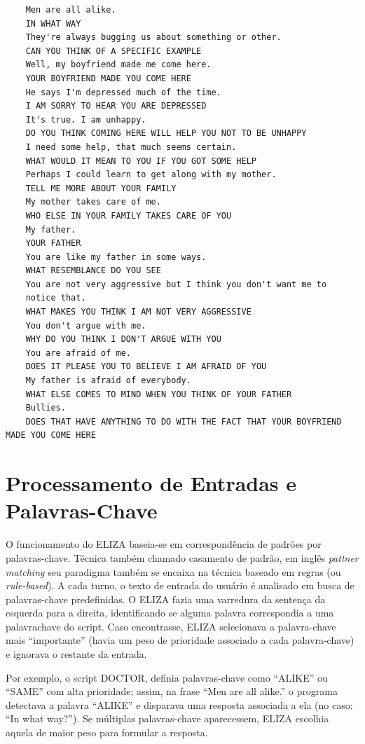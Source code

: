 \documentclass[14pt,a4paper,oneside]{book}
\begin{document}
\begin{verbatim}
	Men are all alike. 
	IN WHAT WAY 
	They're always bugging us about something or other. 
	CAN YOU THINK OF A SPECIFIC EXAMPLE 
	Well, my boyfriend made me come here. 
	YOUR BOYFRIEND MADE YOU COME HERE 
	He says I'm depressed much of the time. 
	I AM SORRY TO HEAR YOU ARE DEPRESSED 
	It's true. I am unhappy. 
	DO YOU THINK COMING HERE WILL HELP YOU NOT TO BE UNHAPPY 
	I need some help, that much seems certain. 
	WHAT WOULD IT MEAN TO YOU IF YOU GOT SOME HELP 
	Perhaps I could learn to get along with my mother. 
	TELL ME MORE ABOUT YOUR FAMILY 
	My mother takes care of me. 
	WHO ELSE IN YOUR FAMILY TAKES CARE OF YOU 
	My father. 
	YOUR FATHER 
	You are like my father in some ways. 
	WHAT RESEMBLANCE DO YOU SEE 
	You are not very aggressive but I think you don't want me to 
	notice that. 
	WHAT MAKES YOU THINK I AM NOT VERY AGGRESSIVE 
	You don't argue with me. 
	WHY DO YOU THINK I DON'T ARGUE WITH YOU 
	You are afraid of me. 
	DOES IT PLEASE YOU TO BELIEVE I AM AFRAID OF YOU 
	My father is afraid of everybody. 
	WHAT ELSE COMES TO MIND WHEN YOU THINK OF YOUR FATHER 
	Bullies. 
	DOES THAT HAVE ANYTHING TO DO WITH THE FACT THAT YOUR BOYFRIEND MADE YOU COME HERE 
\end{verbatim}
	




\section{Processamento de Entradas e Palavras-Chave}

O funcionamento do ELIZA baseia-se em correspondência de padrões por palavras-chave. Técnica também chamado casamento de padrão, em inglês \textit{pattner matching} seu paradigma também se encaixa na técnica baseado em regras (ou \textit{rule-based}). 
A cada turno, o texto de entrada do usuário é analisado em busca de palavras-chave predefinidas. 
O ELIZA fazia uma varredura da sentença da esquerda para a direita, identificando se alguma palavra correspondia a uma palavra\-chave do script. 
Caso encontrasse, ELIZA selecionava a palavra-chave mais “importante” (havia um peso de prioridade associado a cada palavra-chave) e ignorava o restante da entrada.

Por exemplo, o script DOCTOR, definia palavras-chave como “ALIKE” ou “SAME” com alta prioridade; assim, na frase “Men are all alike.” o programa detectava a palavra “ALIKE” e disparava uma resposta associada a ela (no caso: “In what way?”). 
Se múltiplas palavras-chave aparecessem, ELIZA escolhia aquela de maior peso para formular a resposta.
\end{document}
